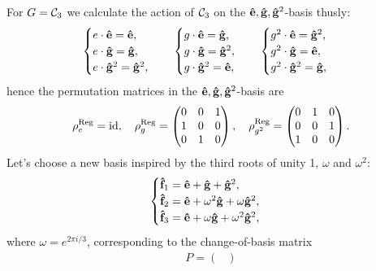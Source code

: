 	{\allowdisplaybreaks\begin{example}
		\label{example:regCyc3}
		For $G = \mathcal{C}_3$ we calculate the action of $\mathcal{C}_3$ on the $\mathbf{\hat{e}}, \mathbf{\hat{g}}, \mathbf{\hat{g}}^2$-basis thusly:
		\begin{align*}
			\begin{cases}
				e \cdot \mathbf{\hat{e}} = \mathbf{\hat{e}}, \\
				e \cdot \mathbf{\hat{g}} = \mathbf{\hat{g}}, \\
				e \cdot \mathbf{\hat{g}}^2 = \mathbf{\hat{g}}^2,
			\end{cases} \quad \begin{cases}
				g \cdot \mathbf{\hat{e}} = \mathbf{\hat{g}}, \\
				g \cdot \mathbf{\hat{g}} = \mathbf{\hat{g}}^2, \\
				g \cdot \mathbf{\hat{g}}^2 = \mathbf{\hat{e}},
			\end{cases} \quad \begin{cases}
			g^2 \cdot \mathbf{\hat{e}} = \mathbf{\hat{g}}^2, \\
			g^2 \cdot \mathbf{\hat{g}} = \mathbf{\hat{e}}, \\
			g^2 \cdot \mathbf{\hat{g}}^2 = \mathbf{\hat{g}},
			\end{cases}
		\end{align*}
		hence the permutation matrices in the $\mathbf{\hat{e}}, \mathbf{\hat{g}}, \mathbf{\hat{g}}^2$-basis are
		\begin{align*}
			\rho_e^{\text{Reg}} = \text{id}, \quad \rho_g^{\text{Reg}} = \begin{pmatrix}
				0&0&1 \\ 1&0&0 \\ 0&1&0
			\end{pmatrix}, \quad \rho_{g^2}^{\text{Reg}} = \begin{pmatrix}
			0&1&0 \\ 0&0&1 \\ 1&0&0 
			\end{pmatrix}.
		\end{align*}
		Let's choose a new basis inspired by the third roots of unity 1, $\omega$ and $\omega^2$:
		\begin{align*}
			\begin{cases}
				\mathbf{\hat{f}}_1 = \mathbf{\hat{e}} + \mathbf{\hat{g}} + \mathbf{\hat{g}}^2, \\
				\mathbf{\hat{f}}_2 = \mathbf{\hat{e}} + \omega^2\mathbf{\hat{g}} + \omega\mathbf{\hat{g}}^2, \\
				\mathbf{\hat{f}}_3 = \mathbf{\hat{e}} + \omega\mathbf{\hat{g}} + \omega^2\mathbf{\hat{g}}^2,
			\end{cases}
		\end{align*}
		where $\omega = e^{2 \pi i/3}$, corresponding to the change-of-basis matrix 
		\begin{align*}
			P = \begin{pmatrix}

\end{pmatrix}
\end{align*}
\end{example}}
